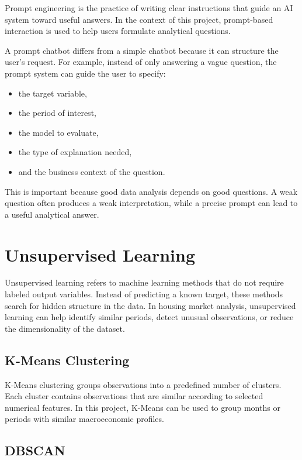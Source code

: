 Prompt engineering is the practice of writing clear instructions that guide an AI system toward useful answers. In the context of this project, prompt-based interaction is used to help users formulate analytical questions.

A prompt chatbot differs from a simple chatbot because it can structure the user's request. For example, instead of only answering a vague question, the prompt system can guide the user to specify:
\begin{itemize}
\item the target variable,
\item the period of interest,
\item the model to evaluate,
\item the type of explanation needed,
\item and the business context of the question.
\end{itemize}

This is important because good data analysis depends on good questions. A weak question often produces a weak interpretation, while a precise prompt can lead to a useful analytical answer.

\section{Unsupervised Learning}

Unsupervised learning refers to machine learning methods that do not require labeled output variables. Instead of predicting a known target, these methods search for hidden structure in the data. In housing market analysis, unsupervised learning can help identify similar periods, detect unusual observations, or reduce the dimensionality of the dataset.

\subsection{K-Means Clustering}

K-Means clustering groups observations into a predefined number of clusters. Each cluster contains observations that are similar according to selected numerical features. In this project, K-Means can be used to group months or periods with similar macroeconomic profiles.

\subsection{DBSCAN}

